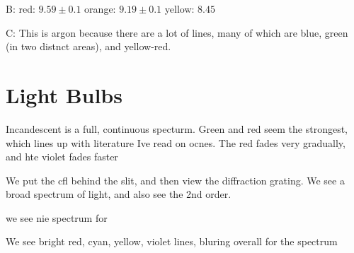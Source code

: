 \documentclass{article}
\begin{document}
B:
red: $9.59\pm0.1$ 
orange: $9.19\pm 0.1$
yellow: $8.45$

C:
This is argon because there are a lot of lines, many of which are blue, green (in two distnct areas), and yellow-red.

\section{Light Bulbs}
Incandescent is a full, continuous specturm. Green and red seem the strongest, which lines up with literature Ive read on ocnes. The red fades very gradually, and hte violet fades faster


We put the cfl behind the slit, and then view the diffraction grating. We see a broad spectrum of light, and also see the 2nd order.

we see nie spectrum for 

We see bright red, cyan, yellow, violet lines, bluring overall for the spectrum
\end{document}

